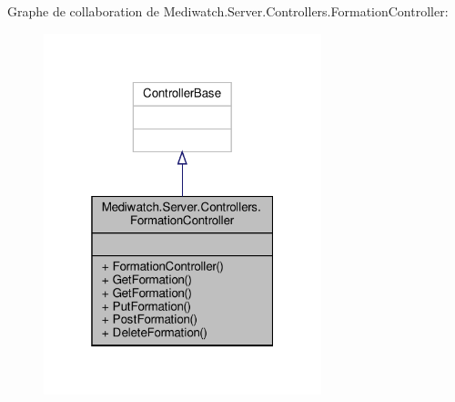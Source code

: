 Graphe de collaboration de Mediwatch.\+Server.\+Controllers.\+Formation\+Controller\+:\nopagebreak
\begin{figure}[H]
\begin{center}
\leavevmode
\includegraphics[width=229pt]{class_mediwatch_1_1_server_1_1_controllers_1_1_formation_controller__coll__graph}
\end{center}
\end{figure}
